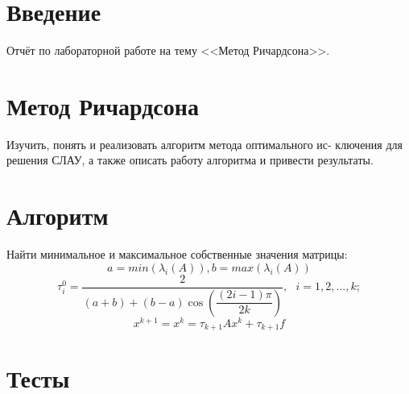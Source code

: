 \documentclass[14pt, titlepage,fleqn]{extarticle}
\begin{document}
	

	
	
	\newpage
	
	\tableofcontents   
	\clearpage
	\section*{Введение}
	Отчёт по лабораторной работе на тему <<Метод Ричардсона>>.	
	\newpage









	\section*{Метод Ричардсона}
	Изучить, понять и реализовать алгоритм метода оптимального ис-
	ключения для решения СЛАУ, а также описать работу алгоритма и
	привести результаты.

	\section*{Алгоритм}
	Найти минимальное и максимальное собственные значения матрицы:
	\[a = min(\lambda_i(A)), b = max(\lambda_i(A))\]	
	\[\tau^{0}_i = \dfrac{2}{(a + b) + (b-a)\cos\left(\dfrac{(2i-1)\pi}{2k}\right)},~~~i=1,2,...,k; \]
	\[x^{k+1} = x^k = \tau_{k+1}Ax^k + \tau_{k+1}f\]
	\section*{Тесты}
\end{document}
